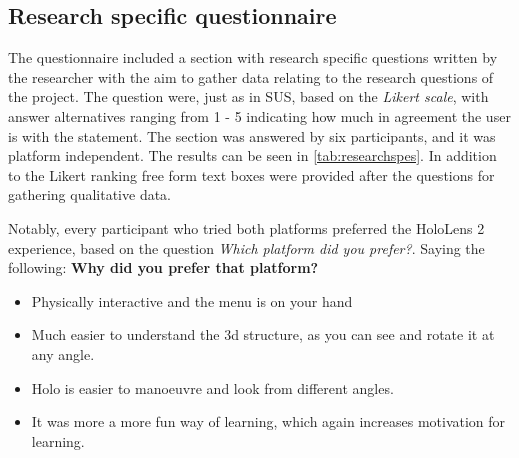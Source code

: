 \subsection{Research specific questionnaire}\label{chap:researchspes}
The questionnaire included a section with research specific questions written by the researcher with the aim to gather data relating to the research questions of the project. The question were, just as in SUS, based on the \textit{Likert scale}, with answer alternatives ranging from 1 - 5 indicating how much in agreement the user is with the statement. The section was answered by six participants, and it was platform independent. The results can be seen in \autoref{tab:researchspes}. In addition to the Likert ranking free form text boxes were provided after the questions for gathering qualitative data. 


Notably, every participant who tried both platforms preferred the HoloLens 2 experience, based on the question \textit{Which platform did you prefer?}. Saying the following:
\newline
\textbf{Why did you prefer that platform?}
{\small\itshape
\begin{itemize}[]
    \item Physically interactive and the menu is on your hand
    \item Much easier to understand the 3d structure, as you can see and rotate it at any angle.
    \item Holo is easier to manoeuvre and look from different angles.
    \item It was more a more fun way of learning, which again increases motivation for learning.
\end{itemize}
}

